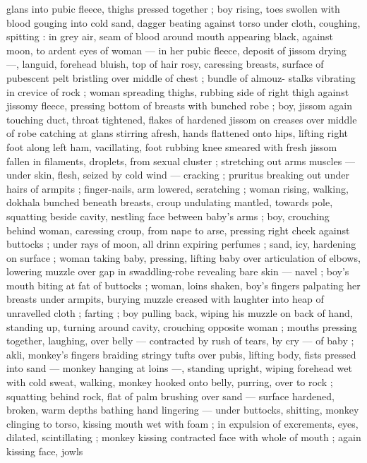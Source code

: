 glans into pubic fleece, thighs pressed together ; boy rising, toes 
swollen with blood gouging into cold sand, dagger beating against 
torso under cloth, coughing, spitting : in grey air, seam of blood 
around mouth appearing black, against moon, to ardent eyes of 
woman --- in her pubic fleece, deposit of jissom drying ---, languid, 
forehead bluish, top of hair rosy, caressing breasts, surface of 
pubescent pelt bristling over middle of chest ; bundle of almouz- 
stalks vibrating in crevice of rock ; woman spreading thighs, rubbing 
side of right thigh against jissomy fleece, pressing bottom of breasts 
with bunched robe ; boy, jissom again touching duct, throat 
tightened, flakes of hardened jissom on creases over middle of robe 
catching at glans stirring afresh, hands flattened onto hips, lifting 
right foot along left ham, vacillating, foot rubbing knee smeared with 
fresh jissom fallen in filaments, droplets, from sexual cluster ; 
stretching out arms {\col} muscles --- under skin, flesh, seized by cold 
wind --- cracking ; pruritus breaking out under hairs of armpits ; 
finger-nails, arm lowered, scratching ; woman rising, walking, 
dokhala bunched beneath breasts, croup undulating mantled, 
towards pole, squatting beside cavity, nestling face between baby's 
arms ; boy, crouching behind woman, caressing croup, from nape to 
arse, pressing right cheek against buttocks ; under rays of moon, all 
drinn expiring perfumes ; sand, icy, hardening on surface ; woman 
taking baby, pressing, lifting baby over articulation of elbows, 
lowering muzzle over gap in swaddling-robe revealing bare skin --- 
navel ; boy's mouth biting at fat of buttocks ; woman, loins shaken, 
boy's fingers palpating her breasts under armpits, burying muzzle 
creased with laughter into heap of unravelled cloth ; farting ; boy 
pulling back, wiping his muzzle on back of hand, standing up, turning 
around cavity, crouching opposite woman ; mouths pressing together, 
laughing, over belly --- contracted by rush of tears, by cry --- of 
baby ; akli, monkey's fingers braiding stringy tufts over pubis, lifting 
body, fists pressed into sand --- monkey hanging at loins ---, 
standing upright, wiping forehead wet with cold sweat, walking, 
monkey hooked onto belly, purring, over to rock ; squatting behind 
rock, flat of palm brushing over sand --- surface hardened, broken, 
warm depths bathing hand lingering --- under buttocks, shitting, 
monkey clinging to torso, kissing mouth wet with foam ; in expulsion 
of excrements, eyes, dilated, scintillating ; monkey kissing 
contracted face with whole of mouth ; again kissing face, jowls 
